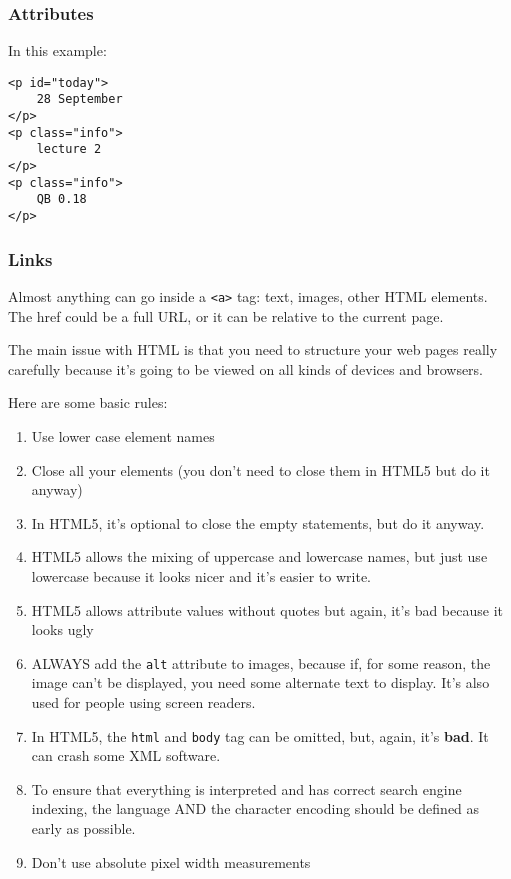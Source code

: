 \documentclass[11pt,a4paper,titlepage,dvipsnames,cmyk]{scrartcl}
\begin{document}
\subsubsection{Attributes}%
\label{ssub:Attributes}
In this example:
\begin{lstlisting}[]
<p id="today">
    28 September
</p>
<p class="info">
    lecture 2
</p>
<p class="info">
    QB 0.18
</p>
\end{lstlisting}

\subsubsection{Links}%
\label{ssub:Links}
Almost anything can go inside a \lstinline{<a>} tag: text, images, other
HTML elements. The href could be a full URL, or it can be relative to the
current page.

The main issue with HTML is that you need to structure your web pages
really carefully because it's going to be viewed on all kinds of devices
and browsers.

Here are some basic rules:
\begin{enumerate}
    \item Use lower case element names
    \item Close all your elements (you don't need to close them in HTML5
        but do it anyway)
    \item In HTML5, it's optional to close the empty statements, but do it
        anyway.
    \item HTML5 allows the mixing of uppercase and lowercase names, but
        just use lowercase because it looks nicer and it's easier to
        write.
    \item HTML5 allows attribute values without quotes but again, it's bad
        because it looks ugly
    \item ALWAYS add the \lstinline{alt} attribute to images, because if,
        for some reason, the image can't be displayed, you need some
        alternate text to display. It's also used for people using screen
        readers.
    \item In HTML5, the \lstinline{html} and \lstinline{body} tag can be
        omitted, but, again, it's \textbf{bad}. It can crash some XML
        software.
    \item To ensure that everything is interpreted and has correct search
        engine indexing, the language AND the character encoding should be
        defined as early as possible.
    \item Don't use absolute pixel width measurements
\end{enumerate}
\end{document}
